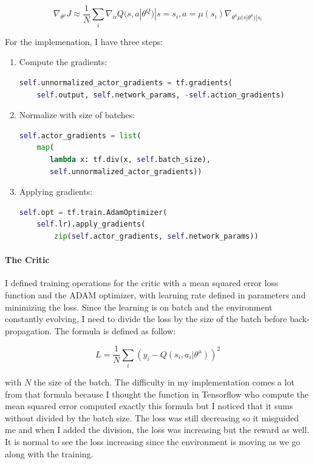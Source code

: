 \documentclass{article}
\begin{document}
\begin{equation}
\nabla_{\theta^{\mu}}J\approx\frac{1}{N}\sum_{i}\nabla_{\alpha}Q(s,a|\theta^{Q})|s=s_{i},a=\mu(s_{i})\nabla_{\theta^{\mu}\mu(s|\theta^{\mu})|s_{i}}
\end{equation}

For the implemenation, I have three steps:
\begin{enumerate}
  
\item Compute the gradients:
\begin{lstlisting}[language=Python]
self.unnormalized_actor_gradients = tf.gradients(
    self.output, self.network_params, -self.action_gradients)
\end{lstlisting}
  
\item Normalize with size of batches:
\begin{lstlisting}[language=Python]
self.actor_gradients = list(
    map(
       lambda x: tf.div(x, self.batch_size),
       self.unnormalized_actor_gradients))  
\end{lstlisting}
  
\item Applying gradients:
\begin{lstlisting}[language=Python]
self.opt = tf.train.AdamOptimizer(
    self.lr).apply_gradients(
        zip(self.actor_gradients, self.network_params))
\end{lstlisting}
\end{enumerate}

\paragraph{The Critic}

I defined training operations for the critic with a mean squared error loss
function and the ADAM optimizer, with learning rate defined in parameters and
minimizing the loss. Since the learning is on batch and the environment
constantly evolving, I need to divide the loss by the size of the batch before
back-propagation. The formula is defined as follow:

\begin{equation}
L = \frac{1}{N}\sum_{i}(y_{i}-Q(s_{i},a_{i}|\theta^{\mu}))^{2}
\end{equation}

with $N$ the size of the batch. The difficulty in my implementation comes a lot
from that formula because I thought the function in Tensorflow who compute the
mean squared error computed exactly this formula but I noticed that it sums
without divided by the batch size. The loss was still decreasing so it misguided
me and when I added the division, the loss was increasing but the reward as
well. It is normal to see the loss increasing since the environment is moving as
we go along with the training.
\end{document}
